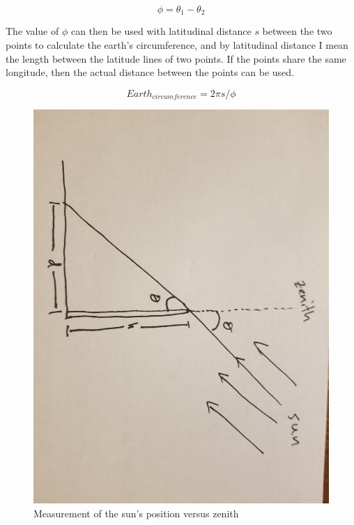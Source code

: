 \documentclass[11pt]{article} %
\newcommand{\be}{\begin{equation}}
\newcommand{\ee}{\end{equation}}
\begin{document}
\be 
\label{theta1-2diff}
  \phi = \theta_1 - \theta_2
\ee

The value of $\phi$ can then be used with latitudinal distance $s$ between the two points to calculate the earth's circumference, 
and by latitudinal distance I mean the length between the latitude lines of two points. 
If the points share the same longitude, then the actual distance between the points can be used.

\be 
\label{}
  Earth_{circumference} = 2\pi s/\phi
\ee


\begin{figure}
  \centering
  \includegraphics[scale=.08]{figures/erato2.jpg}
  \caption{Measurement of the sun's position versus zenith}
  \label{fig:erato2}
\end{figure}
\end{document}
